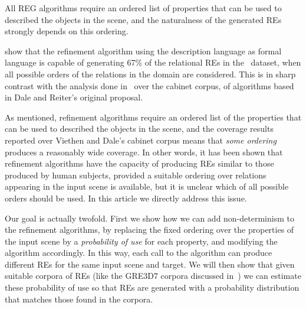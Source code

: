All REG algorithms require an 
ordered list of properties that can be used to described the objects in the scene, and the naturalness of the generated REs strongly depends on this ordering. 


show that the refinement algorithm using the description language \el as formal language is capable of generating 67\% of 
the relational REs in the~\cite{viethen06:_algor_for_gener_refer_expres} dataset, when all possible orders of the relations in the domain are considered. This is in sharp contrast with the analysis 
done in~\cite{viethen06:_algor_for_gener_refer_expres} over the cabinet corpus, of algorithms based in Dale and Reiter's original proposal.    

As mentioned, refinement algorithms require an 
ordered list of the properties that can be used to described the objects in the scene, and the coverage results reported over Viethen and 
Dale's cabinet corpus means that \emph{some ordering} produces a reasonably wide coverage.  In other words, it has been shown that refinement algorithms have the capacity of producing REs similar to those produced by human subjects, provided a suitable ordering over relations appearing 
in the input scene is available, but it is unclear which of all possible orders should be used.  In this article we directly address this issue.  

Our goal is actually twofold. First we show how we can add non-determinism to the refinement algorithms, by replacing the fixed ordering 
over the properties of the input scene by a \emph{probability of use} for each property, and modifying the algorithm accordingly.  
In this way, each call to the algorithm can produce different REs for the same input scene and target.  We will then show that given suitable corpora of REs (like the GRE3D7 corpora discussed in~\cite{viet:gene11}) we can estimate these probability of use so that REs are generated with a probability distribution that matches those found in the corpora.  

